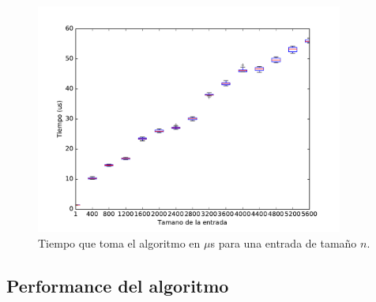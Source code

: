 \begin{figure}[H]
 \centering
	\includegraphics[width=0.9\textwidth]{img/tiempos/genkidama3.pdf}
	\caption{\footnotesize Tiempo que toma el algoritmo en $\mu$s para una entrada de tamaño $n$.}
	\label{fig:genkidama-tiempos3}
\end{figure}

\subsection{Performance del algoritmo}
